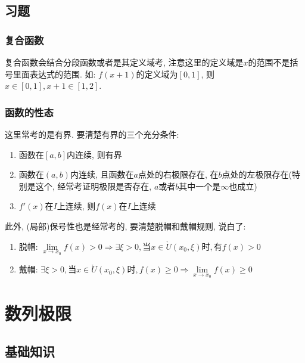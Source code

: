 \section{习题}
\subsection{复合函数}
复合函数会结合分段函数或者是其定义域考, 注意这里的定义域是$ x $的范围不是括号里面表达式的范围. 如: $ f(x+1) $的定义域为$ [0,1] $, 则$ x\in [0,1], x+1\in [1,2] $.
\subsection{函数的性态}
这里常考的是有界. 要清楚有界的三个充分条件:
\begin{enumerate}
\item 函数在$ [a,b] $内连续, 则有界
\item 函数在$ (a,b) $内连续, 且函数在$ a $点处的右极限存在, 在$ b $点处的左极限存在(特别是这个, 经常考证明极限是否存在, $ a $或者$ b $其中一个是$ \infty $也成立)
\item $ f'(x) $在$ I $上连续, 则$ f(x) $在$ I $上连续
\end{enumerate}\par
此外, (局部)保号性也是经常考的, 要清楚脱帽和戴帽规则, 说白了:
\begin{enumerate}
\item 脱帽: $ \lim\limits_{x \rightarrow x_{0}}f(x)>0\Rightarrow \exists \xi>0, \text{当}x\in \mathring{U}(x_{0}, \xi)\text{时}, \text{有}f(x)>0 $
\item 戴帽: $ \exists \xi>0, \text{当}x\in \mathring{U}(x_{0}, \xi)\text{时}, f(x)\ge 0\Rightarrow \lim\limits_{x \rightarrow x_{0}}f(x)\ge 0 $
\end{enumerate}
\chapter{数列极限}
\section{基础知识}
